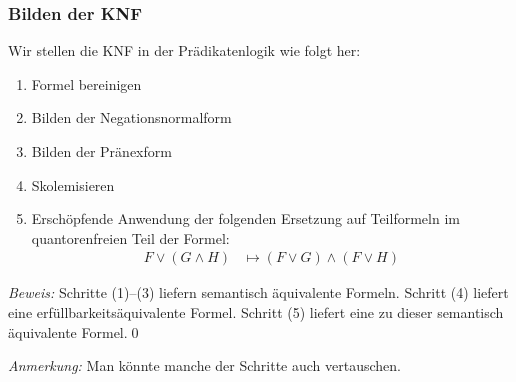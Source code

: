 \documentclass[onlymath]{beamer}
\begin{document}
\begin{frame}\frametitle{Bilden der KNF}

Wir stellen die KNF in der Prädikatenlogik wie folgt her:
\begin{enumerate}[(1)]
\item Formel bereinigen
\item Bilden der Negationsnormalform
\item Bilden der Pränexform
\item Skolemisieren
\item Erschöpfende Anwendung der folgenden Ersetzung auf Teilformeln im quantorenfreien Teil der Formel:
\begin{align*}
F\vee(G\wedge H) &\mapsto (F\vee G)\wedge (F\vee H)
\end{align*}
\end{enumerate}\pause


\emph{Beweis:} Schritte (1)--(3) liefern semantisch äquivalente Formeln. Schritt (4) liefert eine erfüllbarkeitsäquivalente Formel. Schritt (5) liefert eine zu dieser semantisch äquivalente Formel.\qed\medskip

\emph{Anmerkung:} Man könnte manche der Schritte auch vertauschen.

\end{frame}
\end{document}
